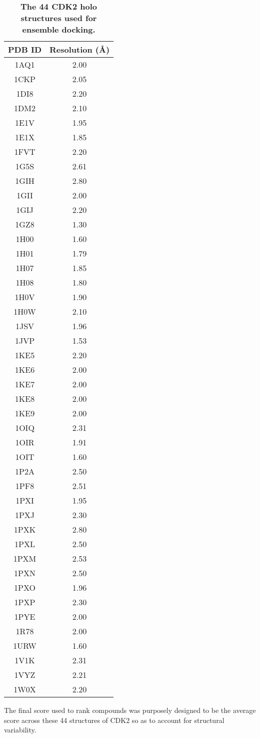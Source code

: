 \documentclass[10pt,letterpaper]{article}
\begin{document}
\begin{table}
\caption{
\bf{The 44 CDK2 holo structures used for ensemble docking.}}
\begin{tabular}{cc}
\hline
PDB ID & Resolution (\AA)\\
\hline
1AQ1 & 2.00\\
1CKP & 2.05\\
1DI8 & 2.20\\
1DM2 & 2.10\\
1E1V & 1.95\\
1E1X & 1.85\\
1FVT & 2.20\\
1G5S & 2.61\\
1GIH & 2.80\\
1GII & 2.00\\
1GIJ & 2.20\\
1GZ8 & 1.30\\
1H00 & 1.60\\
1H01 & 1.79\\
1H07 & 1.85\\
1H08 & 1.80\\
1H0V & 1.90\\
1H0W & 2.10\\
1JSV & 1.96\\
1JVP & 1.53\\
1KE5 & 2.20\\
1KE6 & 2.00\\
1KE7 & 2.00\\
1KE8 & 2.00\\
1KE9 & 2.00\\
1OIQ & 2.31\\
1OIR & 1.91\\
1OIT & 1.60\\
1P2A & 2.50\\
1PF8 & 2.51\\
1PXI & 1.95\\
1PXJ & 2.30\\
1PXK & 2.80\\
1PXL & 2.50\\
1PXM & 2.53\\
1PXN & 2.50\\
1PXO & 1.96\\
1PXP & 2.30\\
1PYE & 2.00\\
1R78 & 2.00\\
1URW & 1.60\\
1V1K & 2.31\\
1VYZ & 2.21\\
1W0X & 2.20\\
\hline
\end{tabular}
\begin{flushleft} The final score used to rank compounds was purposely designed to be the average score across these 44 structures of CDK2 so as to account for structural variability.
\end{flushleft}
\label{PDBs}
\end{table}
\end{document}
